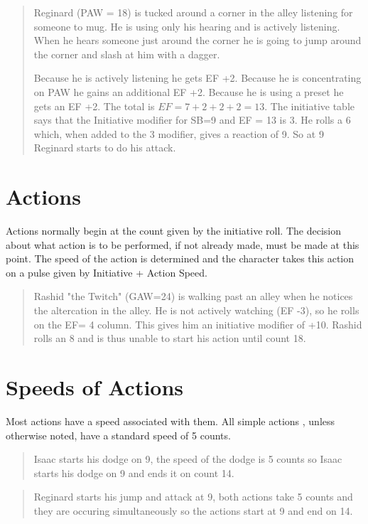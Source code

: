 \begin{quote}
Reginard (PAW = 18) is tucked around a corner in the alley listening 
for someone to mug. He is using only his hearing and is actively 
listening. When he hears someone just around the corner he is going 
to jump around the corner and slash at him with a dagger.

Because he is actively listening he gets EF +2. Because he is 
concentrating on PAW he gains an additional EF +2. Because he is 
using a preset he gets an EF +2. The total is \( EF = 7+2+2+2 = 13\).
The initiative table says that the Initiative modifier for SB=9 and
EF = 13 is 3. He rolls a 6 which, when added to the 3 modifier, gives 
a reaction of 9. So at 9 Reginard starts to do his attack.
\end{quote}


\section{Actions}

Actions normally begin at the count given by the initiative roll. The 
decision about what action is to be performed, if not already made,  
must be made at this point. The speed of the action is determined and 
the character takes this action on a pulse given by Initiative +
Action Speed.  

\begin{quote}
Rashid "the Twitch" (GAW=24) is walking past an alley when he notices the 
altercation in the alley. He is not actively watching (EF -3), so he 
rolls on the EF= 4 column. This gives him an initiative modifier of 
+10. Rashid rolls an 8 and is thus unable to start his action until 
count 18. 
\end{quote}

\section{Speeds of Actions}

Most actions have a speed associated with them. All simple actions 
, unless otherwise noted, have a standard speed of 5 counts. 
 


\begin{quote}
Isaac starts his dodge on 9, the speed of the dodge is 5 counts so 
Isaac starts his dodge on 9 and ends it on count 14. 
\end{quote}

\begin{quote}
Reginard  starts his jump and attack at 9, both actions take 5 counts 
and they are occuring simultaneously so the actions start at 9 and 
end on 14. 
\end{quote}

